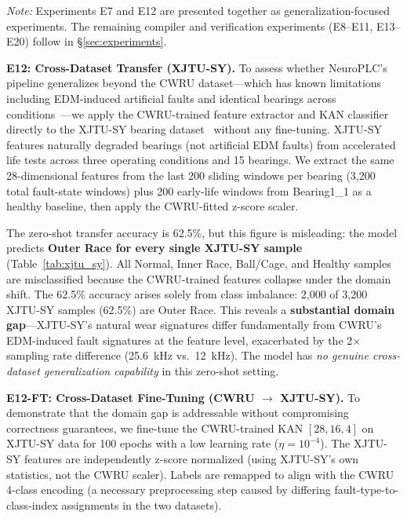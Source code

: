\documentclass[journal,onecolumn]{IEEEtran}
\begin{document}
\vspace{4pt}
{\small\emph{Note:} Experiments E7 and E12 are presented together as
generalization-focused experiments. The remaining compiler and verification
experiments (E8--E11, E13--E20) follow in {\S}\ref{sec:experiments}.}

\vspace{2pt}
\noindent\textbf{E12: Cross-Dataset Transfer (XJTU-SY).} To assess whether
NeuroPLC's pipeline generalizes beyond the CWRU dataset---which has known
limitations including EDM-induced artificial faults and identical bearings
across conditions~\cite{smith2015rolling,hendriks2022towards}---we apply the
CWRU-trained feature extractor and KAN classifier directly to the XJTU-SY
bearing dataset~\cite{xjtusy2020} without any fine-tuning. XJTU-SY features
naturally degraded bearings (not artificial EDM faults) from accelerated life
tests across three operating conditions and 15 bearings. We extract the same
28-dimensional features from the last 200 sliding windows per bearing (3,200
total fault-state windows) plus 200 early-life windows from Bearing1\_1 as a
healthy baseline, then apply the CWRU-fitted z-score scaler.

The zero-shot transfer accuracy is 62.5\%, but this figure is misleading:
the model predicts \textbf{Outer Race for every single XJTU-SY sample}
(Table~\ref{tab:xjtu_sy}). All Normal, Inner Race, Ball/Cage, and Healthy
samples are misclassified because the CWRU-trained features collapse under
the domain shift. The 62.5\% accuracy arises solely from class imbalance:
2,000 of 3,200 XJTU-SY samples (62.5\%) are Outer Race. This reveals a
\textbf{substantial domain gap}---XJTU-SY's natural wear signatures differ
fundamentally from CWRU's EDM-induced fault signatures at the feature level,
exacerbated by the 2$\times$ sampling rate difference (25.6~kHz vs.~12~kHz).
The model has \textit{no genuine cross-dataset generalization capability}
in this zero-shot setting.

\vspace{4pt}
\noindent\textbf{E12-FT: Cross-Dataset Fine-Tuning (CWRU $\to$ XJTU-SY).}
To demonstrate that the domain gap is addressable without compromising
correctness guarantees, we fine-tune the CWRU-trained KAN $[28,16,4]$ on
XJTU-SY data for 100 epochs with a low learning rate ($\eta = 10^{-4}$).
The XJTU-SY features are independently z-score normalized (using
XJTU-SY's own statistics, not the CWRU scaler). Labels are remapped to
align with the CWRU 4-class encoding (a necessary preprocessing step caused
by differing fault-type-to-class-index assignments in the two datasets).
\end{document}
